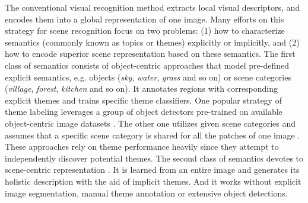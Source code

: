 \documentclass[journal]{IEEEtran}
\begin{document}
The conventional visual recognition method extracts local visual descriptors, and encodes them into a global representation of one image.
Many efforts on this strategy for scene recognition focus on two problems: (1) how to characterize semantics (commonly known as topics or themes) explicitly or implicitly, and (2) how to encode superior scene representation based on these semantics. The first class of semantics consists of object-centric approaches that model pre-defined explicit semantics, e.g. objects (\emph{sky}, \emph{water}, \emph{grass} and so on) or scene categories (\emph{village}, \emph{forest}, \emph{kitchen} and so on). It annotates regions with corresponding explicit themes and trains specific theme classifiers. One popular strategy of theme labeling leverages a group of object detectors pre-trained on available object-centric image datasets \cite{li2014object}. The other one utilizes given scene categories and assumes that a specific scene category is shared for all the patches of one image \cite{kwitt2012scene}. These approaches rely on theme performance heavily since they attempt to independently discover potential themes.
The second class of semantics devotes to scene-centric representation \cite{fei2005bayesian, bosch2006scene, bosch2008scene, rasiwasia2012holistic}. It is learned from an entire image and generates its holistic description with the aid of implicit themes. And it works without explicit image segmentation, manual theme annotation or extensive object detections.
\end{document}
